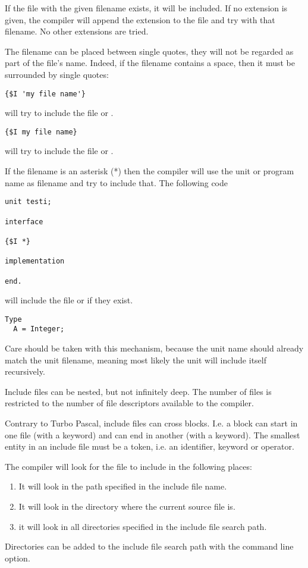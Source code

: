 If the file with the given filename exists, it will be included.
If no extension is given, the compiler will append the  
extension to the file and try with that filename. No other extensions are
tried. 

The filename can be placed between single quotes, they will not be 
regarded as part of the file's name. Indeed, if the filename contains 
a space, then it must be surrounded by single quotes: 

\begin{verbatim}
{$I 'my file name'}
\end{verbatim}
will try to include the file  or .

\begin{verbatim}
{$I my file name}
\end{verbatim}
will try to include the file  or .

If the filename is an asterisk (*) then the compiler will use the unit or
program name as filename and try to include that. The following code

\begin{verbatim}
unit testi;

interface

{$I *}

implementation

end.
\end{verbatim}
will include the file  or  if they exist.
\begin{verbatim}
Type
  A = Integer;
\end{verbatim}
Care should be taken with this mechanism, because the unit name should
already match the unit filename, meaning most likely the unit will include
itself recursively.




Include files can be nested, but not infinitely deep. The number of files is
restricted to the number of file descriptors available to the \fpc compiler.

Contrary to Turbo Pascal, include files can cross blocks. I.e. 
a block can start in one file (with a  keyword) and can end in another (with
a  keyword). The smallest entity in an include file must be a token,
i.e. an identifier, keyword or operator.

The compiler will look for the file to include in the following places:

\begin{enumerate}
\item It will look in the path specified in the include file name.
\item It will look in the directory where the current source file is.
\item it will look in all directories specified in the include file search
path.
\end{enumerate}
Directories can be added to the include file search path with the 
command line option.

